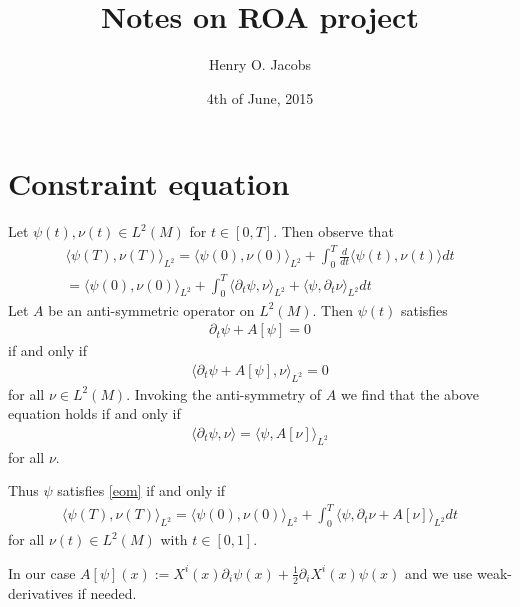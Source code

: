 \documentclass[12pt]{amsart}
\title{Notes on ROA project}
\author{Henry O. Jacobs}
\date{4th of June, 2015}
\begin{document}
\maketitle

\section{Constraint equation}

Let $\psi(t),\nu(t) \in L^2(M)$ for $t \in [0,T]$.
Then observe that
\begin{align*}
  \langle \psi(T) , \nu(T) \rangle_{L^2} = \langle \psi(0) , \nu(0) \rangle_{L^2} + \int_0^T \frac{d}{dt} \langle \psi(t) , \nu(t) \rangle dt \\
 = \langle \psi(0) , \nu(0) \rangle_{L^2}  + 
 \int_0^T \langle \partial_t \psi , \nu \rangle_{L^2} + \langle \psi , \partial_t \nu \rangle_{L^2} dt
\end{align*}
Let $A$ be an anti-symmetric operator on $L^2(M)$.
Then $\psi(t)$ satisfies
\begin{align}
  \partial_t \psi + A[\psi] = 0 \label{eom}
\end{align}
if and only if
\begin{align*}
  \langle \partial_t \psi + A[\psi] , \nu \rangle_{L^2} = 0
\end{align*}
for all $\nu \in L^2(M)$.
Invoking the anti-symmetry of $A$ we find that the above equation holds if and only if
\begin{align*}
  \langle \partial_t \psi , \nu \rangle =  \langle \psi , A[\nu] \rangle_{L^2} 
\end{align*}
for all $\nu$.

Thus $\psi$ satisfies \eqref{eom} if and only if
\begin{align*}
  \langle \psi(T) , \nu(T) \rangle_{L^2} = \langle \psi(0) , \nu(0) \rangle_{L^2} + \int_0^T \langle \psi , \partial_t \nu + A[\nu] \rangle_{L^2} dt
\end{align*}
for all $\nu(t) \in L^2(M)$ with $t \in [0,1]$.


In our case $A[\psi] (x) := X^i(x) \partial_i\psi(x) + \frac{1}{2} \partial_i X^i(x) \psi(x) $ and we use weak-derivatives if needed.
\end{document}

